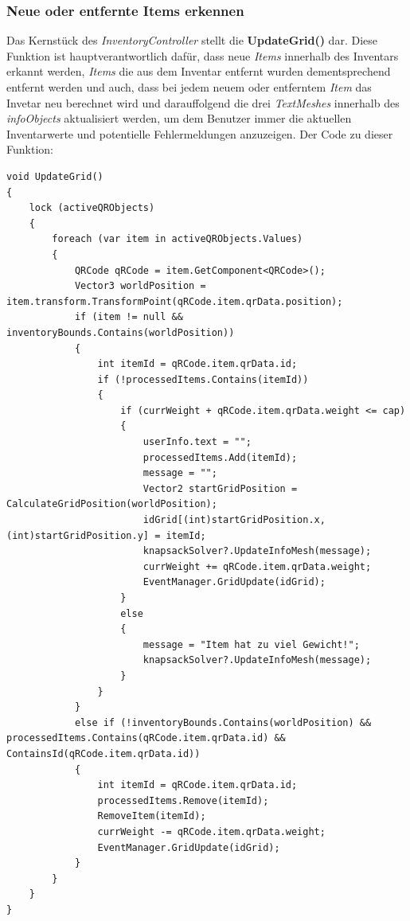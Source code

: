 \subsubsection{Neue oder entfernte Items erkennen}
Das Kernstück des \textit{InventoryController} stellt die \textbf{UpdateGrid()} dar. Diese Funktion ist hauptverantwortlich
dafür, dass neue \textit{Items} innerhalb des Inventars erkannt werden, \textit{Items} die aus dem Inventar entfernt wurden
dementsprechend entfernt werden und auch, dass bei jedem neuem oder entferntem \textit{Item} das Invetar neu berechnet
wird und darauffolgend die drei \textit{TextMeshes} innerhalb des \textit{infoObjects} aktualisiert werden, um dem Benutzer
immer  die aktuellen Inventarwerte und potentielle Fehlermeldungen anzuzeigen. Der Code zu dieser Funktion:
\begin{lstlisting}[style=csharp, caption={Neue / Entfernte Items erkennen}, label=code:controller_updateGrid]
void UpdateGrid()
{
    lock (activeQRObjects)
    {
        foreach (var item in activeQRObjects.Values)
        {
            QRCode qRCode = item.GetComponent<QRCode>();
            Vector3 worldPosition = item.transform.TransformPoint(qRCode.item.qrData.position);
            if (item != null && inventoryBounds.Contains(worldPosition))
            {
                int itemId = qRCode.item.qrData.id;
                if (!processedItems.Contains(itemId))
                {
                    if (currWeight + qRCode.item.qrData.weight <= cap)
                    {
                        userInfo.text = "";
                        processedItems.Add(itemId);
                        message = "";
                        Vector2 startGridPosition = CalculateGridPosition(worldPosition);
                        idGrid[(int)startGridPosition.x, (int)startGridPosition.y] = itemId;
                        knapsackSolver?.UpdateInfoMesh(message);
                        currWeight += qRCode.item.qrData.weight;
                        EventManager.GridUpdate(idGrid);
                    }
                    else
                    {
                        message = "Item hat zu viel Gewicht!";
                        knapsackSolver?.UpdateInfoMesh(message);
                    }
                }
            }
            else if (!inventoryBounds.Contains(worldPosition) && processedItems.Contains(qRCode.item.qrData.id) && ContainsId(qRCode.item.qrData.id))
            {
                int itemId = qRCode.item.qrData.id;
                processedItems.Remove(itemId);
                RemoveItem(itemId);
                currWeight -= qRCode.item.qrData.weight;
                EventManager.GridUpdate(idGrid);
            }
        }
    }
}
\end{lstlisting}\\
